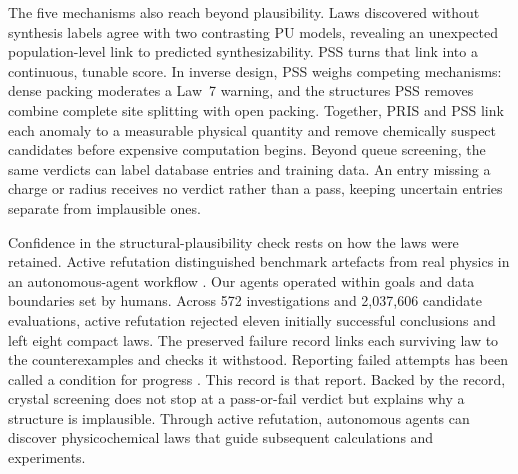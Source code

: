 The five mechanisms also reach beyond plausibility. Laws discovered without synthesis labels
agree with two contrasting PU models, revealing an unexpected population-level link to
predicted synthesizability. PSS turns that link into a continuous, tunable score. In inverse
design, PSS weighs competing mechanisms: dense packing moderates a Law~7 warning, and the
structures PSS removes combine complete site splitting with open
packing. Together, PRIS and PSS link each anomaly to a measurable physical quantity
and remove chemically suspect candidates before expensive computation begins.
Beyond queue screening, the same verdicts can label database entries and training data. An
entry missing a charge or radius receives no verdict rather than a pass, keeping uncertain
entries separate from implausible ones.

Confidence in the structural-plausibility check rests on how the laws were retained. Active
refutation distinguished benchmark artefacts from real physics in an autonomous-agent
workflow \cite{boiko2023autonomous,szymanski2023autonomous,mbran2024augmenting}. Our agents
operated within goals and data boundaries set by humans. Across 572
investigations and 2{,}037{,}606 candidate evaluations, active refutation rejected eleven
initially successful conclusions and left eight compact laws. The preserved failure record
links each surviving law to the counterexamples and checks it withstood. Reporting
failed attempts has been called a condition for progress
\cite{smit2026dataonly}. This record is that report. Backed by the
record, crystal screening does not stop at a pass-or-fail verdict but explains why a
structure is implausible. Through active refutation, autonomous agents can discover
physicochemical laws that guide subsequent calculations and experiments.
